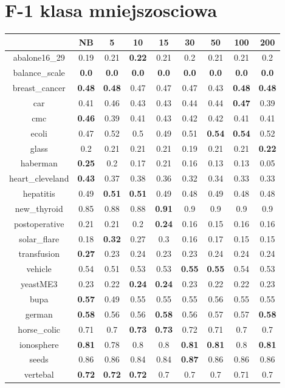 \documentclass{article}%
\begin{document}
%
\section*{F{-}1 klasa mniejszosciowa}%
\begin{tabular}{c|cccccccc}%
\hline%
&NB&5&10&15&30&50&100&200\\%
\hline%
abalone16\_29&0.19&0.21&\textbf{0.22}&0.21&0.2&0.21&0.21&0.2\\%
\hline%
balance\_scale&\textbf{0.0}&\textbf{0.0}&\textbf{0.0}&\textbf{0.0}&\textbf{0.0}&\textbf{0.0}&\textbf{0.0}&\textbf{0.0}\\%
\hline%
breast\_cancer&\textbf{0.48}&\textbf{0.48}&0.47&0.47&0.47&0.43&\textbf{0.48}&\textbf{0.48}\\%
\hline%
car&0.41&0.46&0.43&0.43&0.44&0.44&\textbf{0.47}&0.39\\%
\hline%
cmc&\textbf{0.46}&0.39&0.41&0.43&0.42&0.42&0.41&0.41\\%
\hline%
ecoli&0.47&0.52&0.5&0.49&0.51&\textbf{0.54}&\textbf{0.54}&0.52\\%
\hline%
glass&0.2&0.21&0.21&0.21&0.19&0.21&0.21&\textbf{0.22}\\%
\hline%
haberman&\textbf{0.25}&0.2&0.17&0.21&0.16&0.13&0.13&0.05\\%
\hline%
heart\_cleveland&\textbf{0.43}&0.37&0.38&0.36&0.32&0.34&0.33&0.33\\%
\hline%
hepatitis&0.49&\textbf{0.51}&\textbf{0.51}&0.49&0.48&0.49&0.48&0.48\\%
\hline%
new\_thyroid&0.85&0.88&0.88&\textbf{0.91}&0.9&0.9&0.9&0.9\\%
\hline%
postoperative&0.21&0.21&0.2&\textbf{0.24}&0.16&0.15&0.16&0.16\\%
\hline%
solar\_flare&0.18&\textbf{0.32}&0.27&0.3&0.16&0.17&0.15&0.15\\%
\hline%
transfusion&\textbf{0.27}&0.23&0.24&0.23&0.23&0.24&0.24&0.24\\%
\hline%
vehicle&0.54&0.51&0.53&0.53&\textbf{0.55}&\textbf{0.55}&0.54&0.53\\%
\hline%
yeastME3&0.23&0.22&\textbf{0.24}&\textbf{0.24}&0.23&0.22&0.22&0.23\\%
\hline%
bupa&\textbf{0.57}&0.49&0.55&0.55&0.55&0.56&0.55&0.55\\%
\hline%
german&\textbf{0.58}&0.56&0.56&\textbf{0.58}&0.56&0.57&0.57&\textbf{0.58}\\%
\hline%
horse\_colic&0.71&0.7&\textbf{0.73}&\textbf{0.73}&0.72&0.71&0.7&0.7\\%
\hline%
ionosphere&\textbf{0.81}&0.78&0.8&0.8&\textbf{0.81}&\textbf{0.81}&0.8&\textbf{0.81}\\%
\hline%
seeds&0.86&0.86&0.84&0.84&\textbf{0.87}&0.86&0.86&0.86\\%
\hline%
vertebal&\textbf{0.72}&\textbf{0.72}&\textbf{0.72}&0.7&0.7&0.7&0.71&0.7\\%
\hline%
\end{tabular}
\end{document}
